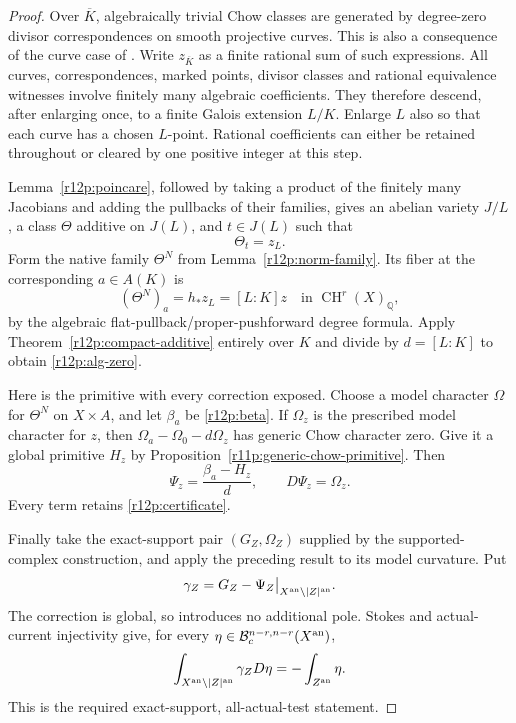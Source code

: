 \begin{proof}
Over $\overline K$, algebraically trivial Chow classes are generated
by degree-zero divisor correspondences on smooth projective curves.
This is also a consequence of the curve case of
\cite[Theorems 1--2, Proposition 3.14]{ACMV}.  Write $z_{\overline K}$
as a finite rational sum of such expressions.  All curves,
correspondences, marked points, divisor classes and rational
equivalence witnesses involve finitely many algebraic coefficients.
They therefore descend, after enlarging once, to a finite Galois
extension $L/K$.  Enlarge $L$ also so that each curve has a chosen
$L$-point.  Rational coefficients can either be retained throughout
or cleared by one positive integer at this step.

Lemma~\ref{r12p:poincare}, followed by taking a product of the
finitely many Jacobians and adding the pullbacks of their families,
gives an abelian variety $J/L$, a class $\Theta$ additive on $J(L)$,
and $t\in J(L)$ such that
\[
                              \Theta_t=z_L.
\]
Form the native family $\Theta^N$ from
Lemma~\ref{r12p:norm-family}.  Its fiber at the corresponding
$a\in A(K)$ is
\[
        (\Theta^N)_a=h_*z_L=[L:K]z
                 \quad\text{in }\operatorname{CH}^r(X)_{\mathbb Q},
\tag{R12.P13}\label{r12p:degree-norm}
\]
by the algebraic flat-pullback/proper-pushforward degree formula.
Apply Theorem~\ref{r12p:compact-additive} entirely over $K$ and
divide by $d=[L:K]$ to obtain \eqref{r12p:alg-zero}.

Here is the primitive with every correction exposed.  Choose a
model character $\Omega$ for $\Theta^N$ on $X\times A$, and let
$\beta_a$ be \eqref{r12p:beta}.  If $\Omega_z$ is the prescribed
model character for $z$, then
$\Omega_a-\Omega_0-d\Omega_z$ has generic Chow character zero.
Give it a global primitive $H_z$ by Proposition~\ref{r11p:generic-chow-primitive}.  Then
\[
             \Psi_z=\frac{\beta_a-H_z}{d},
             \qquad D\Psi_z=\Omega_z.
\tag{R12.P14}\label{r12p:final-primitive}
\]
Every term retains \eqref{r12p:certificate}.

Finally take the exact-support pair $(G_Z,\Omega_Z)$ supplied by
the supported-complex construction, and apply the preceding result
to its model curvature.  Put
\[
       \gamma_Z=G_Z-\Psi_Z\big|_{X^{\rm an}\setminus|Z|^{\rm an}}.
\]
The correction is global, so introduces no additional pole.  Stokes
and actual-current injectivity give, for every
$\eta\in\mathcal B_c^{n-r,n-r}(X^{\rm an})$,
\[
 \int_{X^{\rm an}\setminus|Z|^{\rm an}}\gamma_ZD\eta
                         =-\int_{Z^{\rm an}}\eta.
\]
This is the required exact-support, all-actual-test statement.

\end{proof}
